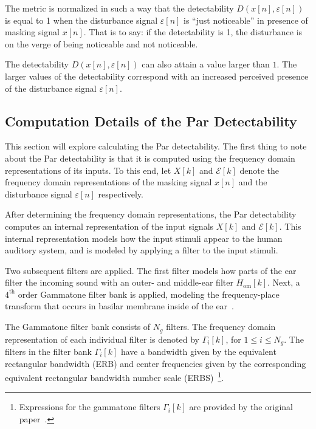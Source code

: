 The metric is normalized in such a way that the detectability $D(x[n],\varepsilon[n])$ is equal to 1 when the 
disturbance signal $\varepsilon[n]$ is ``just noticeable'' in presence of masking signal $x[n]$.
That is to say: if the detectability is 1, the disturbance is on the verge of being noticeable and not noticeable.

The detectability $D(x[n],\varepsilon[n])$ can also attain a value larger than $1$.
The larger values of the detectability correspond with an increased perceived presence of the
disturbance signal $\varepsilon[n]$.

\subsection{Computation Details of the Par Detectability}
\label{ch:perceptual:implementation:computation}
This section will explore calculating the Par detectability.
The first thing to note about the Par detectability is that it is computed using the frequency domain representations of its inputs. 
To this end, let $X[k]$ and $\mathcal{E}[k]$ denote the frequency domain representations of the masking signal $x[n]$ and 
the disturbance signal $\varepsilon[n]$ respectively.

After determining the frequency domain representations, the Par detectability computes an internal representation of the input signals $X[k]$ and $\mathcal{E}[k]$.
This internal representation models how the input stimuli appear to the human auditory system, and is modeled by applying a filter to the input stimuli.

Two subsequent filters are applied.
The first filter models how parts of the ear filter the incoming sound with an outer- and middle-ear filter $H_\text{om}[k]$. 
Next, a $4^\text{th}$ order Gammatone filter bank is applied, modeling the frequency-place transform that occurs in 
basilar membrane inside of the ear~\cite{van2005perceptual}.

The Gammatone filter bank consists of $N_g$ filters.
The frequency domain representation of each individual filter is denoted by $\Gamma_i[k]$, for $1 \leq i \leq N_g$. 
The filters in the filter bank $\Gamma_i[k]$ have a bandwidth given by the equivalent 
rectangular bandwidth (ERB) and center frequencies given by the corresponding equivalent rectangular bandwidth number
scale (ERBS)~\footnote{Expressions for the gammatone filters $\Gamma_i[k]$ are provided by the original paper~\cite{van2005perceptual}.}.

